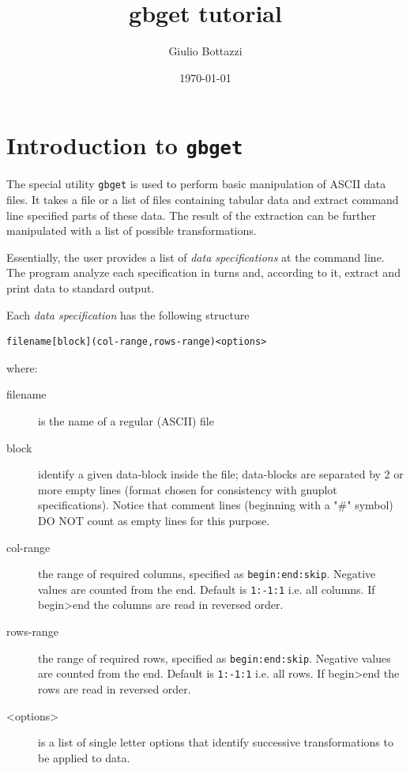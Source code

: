 \documentclass[11pt]{article}
\author{Giulio Bottazzi}
\date{\today}
\title{gbget tutorial}
\begin{document}
\maketitle
\tableofcontents


\section{Introduction to \texttt{gbget}}
\label{sec-1}

The special utility \texttt{gbget} is used to perform basic manipulation of
ASCII data files. It takes a file or a list of files containing
tabular data and extract command line specified parts of these
data. The result of the extraction can be further manipulated with a
list of possible transformations.

Essentially, the user provides a list of \emph{data specifications} at the
command line. The program analyze each specification in turns and,
according to it, extract and print data to standard output.

Each \emph{data specification} has the following structure

\begin{verbatim}
filename[block](col-range,rows-range)<options>
\end{verbatim}

where:

\begin{description}
\item[{filename}] is the name of a regular (ASCII) file

\item[{block}] identify a given data-block inside the file; data-blocks
are separated by 2 or more empty lines (format chosen for
consistency with gnuplot specifications). Notice that
comment lines (beginning with a "\#" symbol) DO NOT count as
empty lines for this purpose.

\item[{col-range}] the range of required columns, specified as
\verb~begin:end:skip~. Negative values are counted from the
end. Default is \verb~1:-1:1~ i.e. all columns. If begin>end
the columns are read in reversed order.
\end{description}


\begin{description}
\item[{rows-range}] the range of required rows, specified as
\verb~begin:end:skip~. Negative values are counted from the
end. Default is \verb~1:-1:1~ i.e. all rows. If begin>end
the rows are read in reversed order.

\item[{<options>}] is a list of single letter options that identify
successive transformations to be applied to data.
\end{description}
\end{document}
